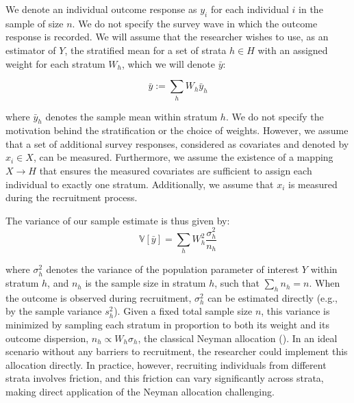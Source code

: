 We denote an individual outcome response as $y_i$ for each individual $i$ in the sample of size $n$. We do not specify the survey wave in which the outcome response is recorded. We will assume that the researcher wishes to use, as an estimator of $Y$, the stratified mean for a set of strata $h \in H$ with an assigned weight for each stratum $W_h$, which we will denote $\bar{y}$:

$$
\bar{y} := \sum_h W_h\bar{y}_h
$$

where $\bar{y}_h$ denotes the sample mean within stratum $h$. We do not specify the motivation behind the stratification or the choice of weights. However, we assume that a set of additional survey responses, considered as covariates and denoted by \( x_i \in X \), can be measured. Furthermore, we assume the existence of a mapping \( X \rightarrow H \) that ensures the measured covariates are sufficient to assign each individual to exactly one stratum. Additionally, we assume that \( x_i \) is measured during the recruitment process.








The variance of our sample estimate is thus given by:
$$
\mathbb{V}[\bar{y}] =  \sum_{h}  W_h^2 \frac{\sigma_h^2}{n_h}
$$


where $\sigma_h^2$ denotes the variance of the population parameter of interest $Y$ within stratum $h$, and $n_h$ is the sample size in stratum $h$, such that $\sum_h n_h = n$. When the outcome is observed during recruitment, $\sigma_h^2$ can be estimated directly (e.g., by the sample variance $s_h^2$). Given a fixed total sample size $n$, this variance is minimized by sampling each stratum in proportion to both its weight and its outcome dispersion, $n_h \propto W_h \sigma_h$, the classical Neyman allocation (\citealt{Neyman1934,Groves2010}). In an ideal scenario without any barriers to recruitment, the researcher could implement this allocation directly. In practice, however, recruiting individuals from different strata involves friction, and this friction can vary significantly across strata, making direct application of the Neyman allocation challenging.

